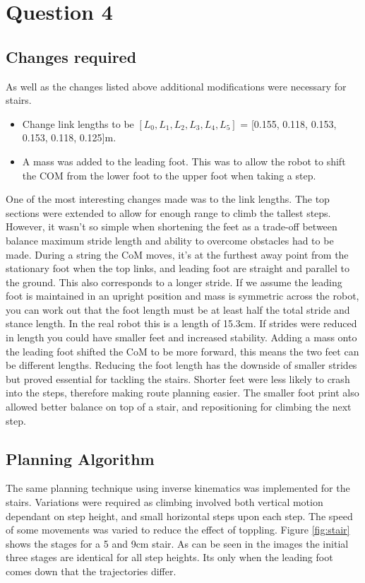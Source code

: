 \documentclass[twoside,twocolumn]{article}
\begin{document}
\section{Question 4}
\subsection{Changes required}
As well as the changes listed above additional modifications were necessary for stairs.
\begin{itemize}
\item Change link lengths to be $[L_0, L_1, L_2, L_3, L_4, L_5]$ = [0.155, 0.118, 0.153, 0.153, 0.118, 0.125]m.
\item A mass was added to the leading foot. This was to allow the robot to shift the COM from the lower foot to the upper foot when taking a step.
\end{itemize}
One of the most interesting changes made was to the link lengths. The top sections were extended to allow for enough range to climb the tallest steps. However, it wasn't so simple when shortening the feet as a trade-off between balance maximum stride length and ability to overcome obstacles had to be made.  During a string the CoM moves, it's at the furthest away point from the stationary foot when the top links, and leading foot are straight and parallel to the ground. This also corresponds to a longer stride. If we assume the leading foot is maintained in an upright position and mass is symmetric across the robot, you can work out that the foot length must be at least half the total stride and stance length. In the  real robot this is a length of 15.3cm. If strides were reduced in length you could have smaller feet and increased stability. Adding a mass onto the leading foot shifted the CoM to be more forward, this means the two feet can be different lengths. Reducing the foot length has the downside of smaller strides but proved essential for tackling the stairs. Shorter feet were less likely to crash into the steps, therefore making route planning easier. The smaller foot print also allowed better balance on top of a stair, and repositioning for climbing the next step.  

\subsection{Planning Algorithm}
The same planning technique using inverse kinematics was implemented for the stairs. Variations were required as climbing involved both vertical motion dependant on step height, and small horizontal steps upon each step. The speed of some movements was varied to reduce the effect of toppling. Figure \ref{fig:stair} shows the stages for a 5 and 9cm stair. As can be seen in the images the initial three stages are identical for all step heights. Its only when the leading foot comes down that the trajectories differ. 
\end{document}
